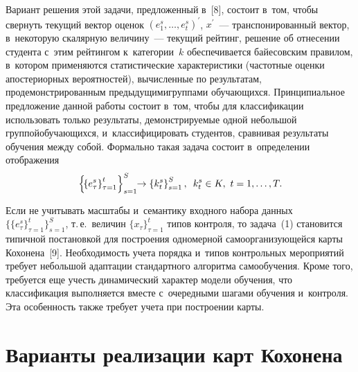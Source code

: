 \begin{multicols}{2}
     Вариант решения этой задачи, предложенный в~[8], состоит в~том, 
чтобы свернуть текущий вектор оценок $(e_1^s, \ldots , e_t^s)^\prime$, $x^\prime$~--- 
транспонированный вектор, в~некоторую скалярную величину~--- текущий 
рейтинг, решение об отнесении студента с~этим рейтингом к~категории~$k$ 
обеспечивается байесовским правилом, в~котором применяются 
статистические характеристики (частотные оценки апостериорных 
вероятностей), вычисленные по результатам, продемонстрированным 
предыдущими\linebreak группами обуча\-ющих\-ся. Принципиальное предложение 
данной работы состоит в~том, чтобы для классификации использовать только 
результаты, демонстрируемые одной небольшой группой\linebreak \mbox{обуча\-ющих\-ся}, 
и~классифицировать студентов, сравнивая результаты обуче\-ния между 
собой. Формально такая задача состоит в~определении отображения
     \begin{equation}
     \left\{\!\left\{ e_\tau^s\right\}^t_{\tau=1} \right\}^S_{s=1}\!\! \to \left\{ 
k_t^s\right\}^S_{s=1},\enskip k_t^s\in K,\ t=1,\ldots , T.\!
     \label{e1-bos}
     \end{equation}
     
     Если не учитывать масштабы и~семантику входного набора данных 
     $\{\{ e_\tau^s\}^t_{\tau=1} \}^S_{s=1}$, т.\,е.\ величин $\{ 
x_\tau\}^t_{\tau=1}$ типов контроля, то задача~(1) становится типичной 
постановкой для построения одномерной самоорганизующейся карты 
Кохонена~[9]. Необходимость учета порядка и~типов контрольных 
мероприятий требует небольшой адаптации стандартного алгоритма 
самообучения. Кроме того, требуется еще учесть динамический характер 
модели обучения, что классификация выполняется вместе с~очередными 
шагами обучения и~контроля. Эта особенность также требует учета при 
по\-стро\-ении карты.
     
\section{Варианты реализации карт Кохонена}


\end{multicols}
